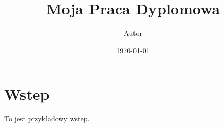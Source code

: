 \documentclass{article}
\begin{document}
\title{Moja Praca Dyplomowa}
\author{Autor}
\date{\today}
\maketitle
\section{Wstep}
To jest przykladowy wstep.
\end{document}

